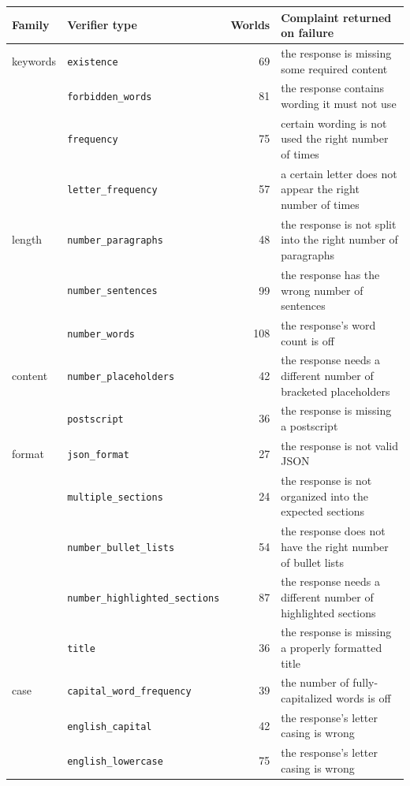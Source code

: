 \begin{table}[t]
  \centering\small
  \begin{tabular}{@{}llr>{\raggedright\arraybackslash}p{}@{}}
    \toprule
    Family & Verifier type & Worlds & Complaint returned on failure \\
    \midrule
    keywords & \texttt{existence} & 69 & the response is missing some required content \\
     & \texttt{forbidden\_words} & 81 & the response contains wording it must not use \\
     & \texttt{frequency} & 75 & certain wording is not used the right number of times \\
     & \texttt{letter\_frequency} & 57 & a certain letter does not appear the right number of times \\
    \addlinespace
    length & \texttt{number\_paragraphs} & 48 & the response is not split into the right number of paragraphs \\
     & \texttt{number\_sentences} & 99 & the response has the wrong number of sentences \\
     & \texttt{number\_words} & 108 & the response's word count is off \\
    \addlinespace
    content & \texttt{number\_placeholders} & 42 & the response needs a different number of bracketed placeholders \\
     & \texttt{postscript} & 36 & the response is missing a postscript \\
    \addlinespace
    format & \texttt{json\_format} & 27 & the response is not valid JSON \\
     & \texttt{multiple\_sections} & 24 & the response is not organized into the expected sections \\
     & \texttt{number\_bullet\_lists} & 54 & the response does not have the right number of bullet lists \\
     & \texttt{number\_highlighted\_sections} & 87 & the response needs a different number of highlighted sections \\
     & \texttt{title} & 36 & the response is missing a properly formatted title \\
    \addlinespace
    case & \texttt{capital\_word\_frequency} & 39 & the number of fully-capitalized words is off \\
     & \texttt{english\_capital} & 42 & the response's letter casing is wrong \\
     & \texttt{english\_lowercase} & 75 & the response's letter casing is wrong \\

\end{tabular}
\end{table}
